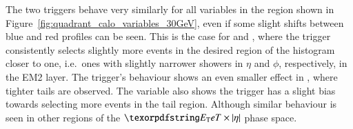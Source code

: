 The two triggers behave very similarly for all variables in the region shown in Figure~\ref{fig:quadrant_calo_variables_30GeV}, even if some slight shifts between blue and red profiles can be seen. This is the case for \reta{} and \rphi{}, where the \rnn{} trigger consistently selects slightly more events in the desired region of the histogram closer to one, i.e.\ ones with slightly narrower showers in $\eta{}$ and $\phi{}$, respectively, in the EM2 layer. The \rnn{} trigger's behaviour shows an even smaller effect in \rhad{}, where tighter tails are observed.%
The \eratio{} variable also shows the \rnn{} trigger has a slight bias towards selecting more events in the tail region. 
Although similar behaviour is seen in other 
regions of the $\eteta$ phase space.


